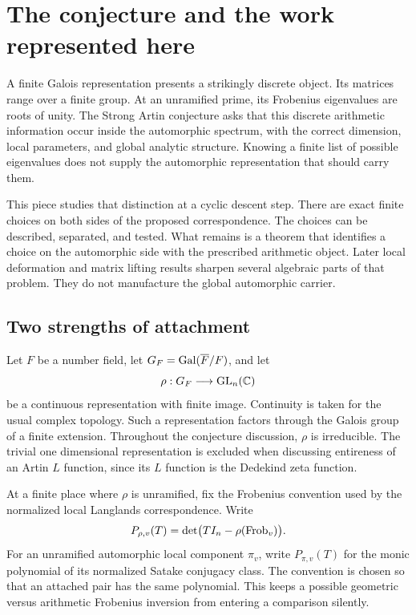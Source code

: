 \section{The conjecture and the work represented here}\label{sec:introduction}

A finite Galois representation presents a strikingly discrete object. Its matrices range over a finite group. At an unramified prime, its Frobenius eigenvalues are roots of unity. The Strong Artin conjecture asks that this discrete arithmetic information occur inside the automorphic spectrum, with the correct dimension, local parameters, and global analytic structure. Knowing a finite list of possible eigenvalues does not supply the automorphic representation that should carry them.

This piece studies that distinction at a cyclic descent step. There are exact finite choices on both sides of the proposed correspondence. The choices can be described, separated, and tested. What remains is a theorem that identifies a choice on the automorphic side with the prescribed arithmetic object. Later local deformation and matrix lifting results sharpen several algebraic parts of that problem. They do not manufacture the global automorphic carrier.

\subsection{Two strengths of attachment}

Let \(F\) be a number field, let \(G_F=\operatorname{Gal}(\overline F/F)\), and let
\[
 \rho:G_F\longrightarrow\operatorname{GL}_n(\mathbb C)
\]
be a continuous representation with finite image. Continuity is taken for the usual complex topology. Such a representation factors through the Galois group of a finite extension. Throughout the conjecture discussion, \(\rho\) is irreducible. The trivial one dimensional representation is excluded when discussing entireness of an Artin \(L\) function, since its \(L\) function is the Dedekind zeta function.

At a finite place where \(\rho\) is unramified, fix the Frobenius convention used by the normalized local Langlands correspondence. Write
\[
 P_{\rho,v}(T)=\det\bigl(TI_n-\rho(\operatorname{Frob}_v)\bigr).
\]
For an unramified automorphic local component \(\pi_v\), write \(P_{\pi,v}(T)\) for the monic polynomial of its normalized Satake conjugacy class. The convention is chosen so that an attached pair has the same polynomial. This keeps a possible geometric versus arithmetic Frobenius inversion from entering a comparison silently.

